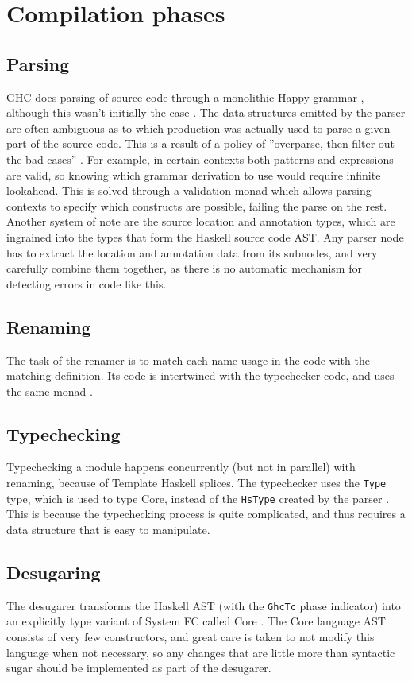 \documentclass[en]{pracamgr}
\begin{document}
\section{Compilation phases}
\subsection{Parsing}
GHC does parsing of source code through a monolithic Happy grammar \cite{Happy}, although this wasn't initially the case \cite{Jones1993TheGH}.
The data structures emitted by the parser are often ambiguous as to which production was actually used to parse a given part of the source code.
This is a result of a policy of ''overparse, then filter out the bad cases'' \cite{ParserWiki}.
For example, in certain contexts both patterns and expressions are valid, so knowing which grammar derivation to use would require infinite lookahead.
This is solved through a validation monad which allows parsing contexts to specify which constructs are possible, failing the parse on the rest.
Another system of note are the source location and annotation types, which are ingrained into the types that form the Haskell source code AST.
Any parser node has to extract the location and annotation data from its subnodes, and very carefully combine them together,
as there is no automatic mechanism for detecting errors in code like this.

\subsection{Renaming}
The task of the renamer is to match each name usage in the code with the matching definition. 
Its code is intertwined with the typechecker code, and uses the same monad \cite{RenamerWiki}.

\subsection{Typechecking}
Typechecking a module happens concurrently (but not in parallel) with renaming, because of Template Haskell splices.
The typechecker uses the \texttt{Type} type, which is used to type Core, instead of the \texttt{HsType} created by the parser \cite{TypecheckerWiki}.
This is because the typechecking process is quite complicated, and thus requires a data structure that is easy to manipulate.

\subsection{Desugaring}
The desugarer transforms the Haskell AST (with the \texttt{GhcTc} phase indicator) into an explicitly type variant of System FC called Core \cite{CoreWiki}.
The Core language AST consists of very few constructors, and great care is taken to not modify this language when not necessary, 
so any changes that are little more than syntactic sugar should be implemented as part of the desugarer.
\end{document}
